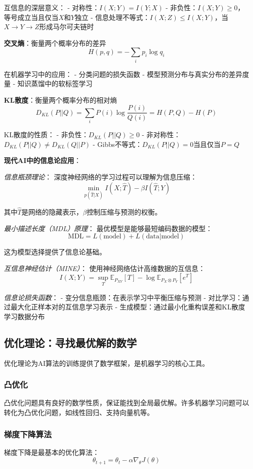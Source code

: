 互信息的深层意义：
- 对称性：$I(X;Y) = I(Y;X)$
- 非负性：$I(X;Y) \geq 0$，等号成立当且仅当$X$和$Y$独立
- 信息处理不等式：$I(X;Z) \leq I(X;Y)$，当$X \to Y \to Z$形成马尔可夫链时

\textbf{交叉熵}：衡量两个概率分布的差异
$$H(p,q) = -\sum_{i} p_i \log q_i$$

在机器学习中的应用：
- 分类问题的损失函数
- 模型预测分布与真实分布的差异度量
- 知识蒸馏中的软标签学习

\textbf{KL散度}：衡量两个概率分布的相对熵
$$D_{KL}(P||Q) = \sum_{i} P(i) \log \frac{P(i)}{Q(i)} = H(P,Q) - H(P)$$

KL散度的性质：
- 非负性：$D_{KL}(P||Q) \geq 0$
- 非对称性：$D_{KL}(P||Q) \neq D_{KL}(Q||P)$
- Gibbs不等式：$D_{KL}(P||Q) = 0$当且仅当$P = Q$

\textbf{现代AI中的信息论应用}：

\textit{信息瓶颈理论}：
深度神经网络的学习过程可以理解为信息压缩：
$$\min_{p(\hat{T}|X)} I(X; \hat{T}) - \beta I(\hat{T}; Y)$$

其中$\hat{T}$是网络的隐藏表示，$\beta$控制压缩与预测的权衡。

\textit{最小描述长度（MDL）原理}：
最优模型是能够最短编码数据的模型：
$$\text{MDL} = L(\text{model}) + L(\text{data}|\text{model})$$

这为模型选择提供了信息论基础。

\textit{互信息神经估计（MINE）}：
使用神经网络估计高维数据的互信息：
$$I(X;Y) = \sup_{T} \mathbb{E}_{P_{XY}}[T] - \log \mathbb{E}_{P_X \otimes P_Y}[e^T]$$

\textit{信息论损失函数}：
- 变分信息瓶颈：在表示学习中平衡压缩与预测
- 对比学习：通过最大化正样本对的互信息学习表示
- 生成模型：通过最小化重构误差和KL散度学习数据分布

\subsection{优化理论：寻找最优解的数学}

优化理论为AI算法的训练提供了数学框架，是机器学习的核心工具。

\subsubsection{凸优化}
凸优化问题具有良好的数学性质，保证能找到全局最优解。许多机器学习问题可以转化为凸优化问题，如线性回归、支持向量机等。

\subsubsection{梯度下降算法}
梯度下降是最基本的优化算法：
$$\theta_{t+1} = \theta_t - \alpha \nabla_\theta J(\theta)$$

